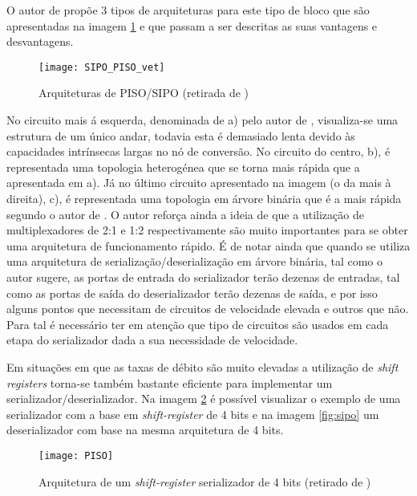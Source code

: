 O autor de \cite{R012} propõe 3 tipos de arquiteturas para este tipo de bloco que são apresentadas na imagem \ref{fig:PISO-SIPO} e que passam a ser descritas as suas vantagens e desvantagens.


	\begin{figure}[h!]
	\begin{center}
		\leavevmode
		\texttt{[image: SIPO\_PISO\_vet]}
		\caption[Arquiteturas de PISO/SIPO]{Arquiteturas de PISO/SIPO (retirada de \cite{R012})}
		\label{fig:PISO-SIPO}
	\end{center}
\end{figure}

No circuito mais á esquerda, denominada de a) pelo autor de \cite{R012}, visualiza-se uma estrutura de um único andar, todavia esta é demasiado lenta devido às capacidades intrínsecas largas no nó de conversão. No circuito do centro, b), é representada uma topologia  heterogénea que se torna mais rápida que a apresentada em a). Já no último circuito apresentado na imagem (o da mais à direita), c), é representada uma topologia em árvore binária que é a mais rápida segundo o autor de \cite{R012}. O autor reforça ainda a ideia de que a utilização de multiplexadores de 2:1 e 1:2 respectivamente são muito importantes para se obter uma arquitetura de funcionamento rápido. É de notar ainda que quando se utiliza uma arquitetura de serialização/deserialização em árvore binária, tal como o autor sugere, as portas de entrada do serializador terão dezenas de entradas, tal como as portas de saída do deserializador terão dezenas de saída, e por isso alguns pontos que necessitam de circuitos de velocidade elevada e outros que não. Para tal é necessário ter em atenção que tipo de circuitos são usados em cada etapa do serializador dada a sua necessidade de velocidade.

Em situações em que as taxas de débito são muito elevadas a utilização de \textit{shift registers} torna-se também bastante eficiente para implementar um serializador/deserializador. Na imagem \ref{fig:piso} é possível visualizar o exemplo de uma serializador com a base em\textit{ shift-register} de 4 bits e na imagem \ref{fig:sipo} um deserializador com base na mesma arquitetura de 4 bits.

	\begin{figure}[h!]
	\begin{center}
		\leavevmode
		\texttt{[image: PISO]}
		\caption[Arquitetura de um \textit{shift-register} serializador de 4 bits]{Arquitetura de um \textit{shift-register} serializador de 4 bits (retirado de \cite{R034})}
		\label{fig:piso}
	\end{center}
\end{figure}

